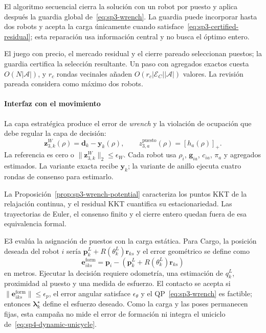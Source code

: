 El algoritmo secuencial cierra la solución con un robot por puesto y aplica después la guardia global de~\eqref{eq:sp3-wrench}. La guardia puede incorporar hasta dos robots y acepta la carga únicamente cuando satisface~\eqref{eq:sp3-certified-residual}; esta reparación usa información central y no busca el óptimo entero.

El juego con precio, el mercado residual y el cierre pareado seleccionan puestos; la guardia certifica la selección resultante. Un paso con agregados exactos cuesta $O(N|\mathcal A|)$, y $r_c$ rondas vecinales añaden $O(r_c|\mathcal E_C||\mathcal A|)$ valores. La revisión pareada considera como máximo dos robots.

\paragraph{Interfaz con el movimiento}

La capa estratégica produce el error de \emph{wrench} y la violación de ocupación que debe regular la capa de decisión:
\begin{equation}
 \boldsymbol z_{3,k}^{W}(\rho)
 =\boldsymbol d_k-\boldsymbol y_k(\rho),
 \qquad
 z_{3,a}^{\mathrm{puesto}}(\rho)=[h_a(\rho)]_+.
 \label{eq:sp3-strategic-regulation}
\end{equation}
La referencia es cero o $\|\boldsymbol z_{3,k}^{W}\|_2\leq\epsilon_W$. Cada robot usa $\rho_i$, $\boldsymbol g_{ia}$, $c_{ia}$, $\pi_a$ y agregados estimados. La variante exacta recibe $\boldsymbol y_k$; la variante de anillo ejecuta cuatro rondas de consenso para estimarlo.

La Proposición~\ref{prop:sp3-wrench-potential} caracteriza los puntos KKT de la relajación continua, y el residual KKT cuantifica su estacionariedad. Las trayectorias de Euler, el consenso finito y el cierre entero quedan fuera de esa equivalencia formal.

E3 evalúa la asignación de puestos con la carga estática. Para Cargo, la posición deseada del robot $i$ sería $\boldsymbol p_k^L+R(\theta_k^L)\boldsymbol r_{ks}$ y el error geométrico se define como
\begin{equation}
\label{eq:sp3-formation-error}
  \boldsymbol e_{iks}^{\mathrm{form}}
  =\boldsymbol p_i-
   \left(\boldsymbol p_k^L+R(\theta_k^L)\boldsymbol r_{ks}\right)
\end{equation}
en metros. Ejecutar la decisión requiere odometría, una estimación de $q_k^L$, proximidad al puesto y una medida de esfuerzo. El contacto se acepta si $\|\boldsymbol e_{iks}^{\mathrm{form}}\|\leq\epsilon_p$, el error angular satisface $\epsilon_\theta$ y el QP~\eqref{eq:sp3-wrench} es factible; entonces $\boldsymbol\lambda_k^\star$ define el esfuerzo deseado. Como la carga y las poses permanecen fijas, esta campaña no mide el error de formación ni integra el uniciclo de~\eqref{eq:sp4-dynamic-unicycle}.

